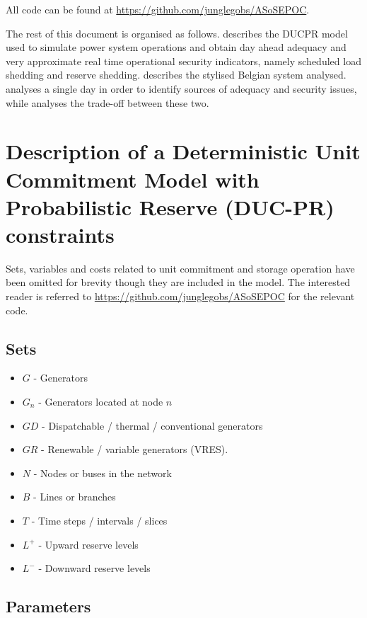 \documentclass[number,times]{elsarticle}
\begin{document}
All code can be found at \href{https://github.com/junglegobs/ASoSEPOC}{https://github.com/junglegobs/ASoSEPOC}.

The rest of this document is organised as follows.  describes the \ac{DUCPR} model used to simulate power system operations and obtain day ahead adequacy and very approximate real time operational security indicators, namely scheduled load shedding and reserve shedding.  describes the stylised Belgian system analysed.  analyses a single day in order to identify sources of adequacy and security issues, while  analyses the trade-off between these two.

\section{Description of a Deterministic Unit Commitment Model with Probabilistic Reserve (DUC-PR) constraints} \label{sec:model}

Sets, variables and costs related to unit commitment and storage operation have been omitted for brevity though they are included in the model. The interested reader is referred to \href{https://github.com/junglegobs/ASoSEPOC}{https://github.com/junglegobs/ASoSEPOC} for the relevant code.

\subsection{Sets}

\begin{itemize}
    \item $G$ - Generators
    \item $G_n$ - Generators located at node $n$
    \item $GD$ - Dispatchable / thermal / conventional generators
    \item $GR$ - Renewable / variable generators (\ac{VRES}).
    \item $N$ - Nodes or buses in the network
    \item $B$ - Lines or branches
    \item $T$ - Time steps / intervals / slices
    \item $L^+$ - Upward reserve levels
    \item $L^-$ - Downward reserve levels
\end{itemize}

\subsection{Parameters}
\end{document}
